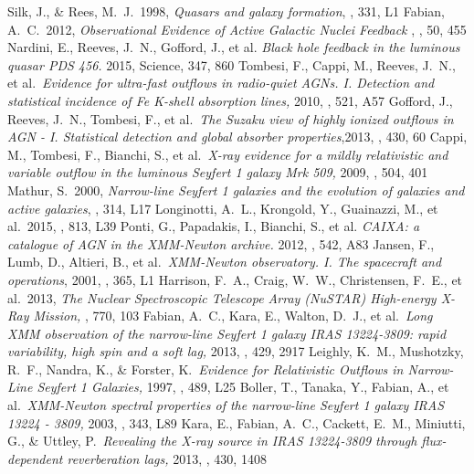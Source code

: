 \documentclass[10pt, a4paper]{article}
\begin{document}
\begin{thebibliography}{1}

 Silk, J., \& Rees, M.~J.\ 1998, \emph{Quasars and galaxy formation}, \aap, 331, L1 
 Fabian, A.~C.\ 2012, \emph{Observational Evidence of Active Galactic Nuclei Feedback} , \araa, 50, 455
 Nardini, E., Reeves, J.~N., Gofford, J., et al. \emph{Black hole feedback in the luminous quasar PDS 456.} 2015, Science, 347, 860 
 Tombesi, F., Cappi, M., Reeves, J.~N., et al.\ \emph{Evidence for ultra-fast outflows in radio-quiet AGNs. I. Detection and statistical incidence of Fe K-shell absorption lines, }2010, \aap, 521, A57 
 Gofford, J., Reeves, J.~N., Tombesi, F., et al.\ \emph{The Suzaku view of highly ionized outflows in AGN - I. Statistical detection and global absorber properties},2013, \mnras, 430, 60 
 Cappi, M., Tombesi, F., Bianchi, S., et al.\ \emph{X-ray evidence for a mildly relativistic and variable outflow in the luminous Seyfert 1 galaxy Mrk 509,} 2009, \aap, 504, 401 
 Mathur, S.\ 2000, \emph{Narrow-line Seyfert 1 galaxies and the evolution of galaxies and active galaxies}, \mnras, 314, L17 
 Longinotti, A.~L., Krongold, Y., Guainazzi, M., et al.\ 2015, \apjl, 813, L39 
 Ponti, G., Papadakis, I., Bianchi, S., et al. \emph{CAIXA: a catalogue of AGN in the XMM-Newton archive.}  2012, \aap, 542, A83 
 Jansen, F., Lumb, D., Altieri, B., et al.\ \emph{XMM-Newton observatory. I. The spacecraft and operations}, 2001, \aap, 365, L1 
 Harrison, F.~A., Craig, W.~W., Christensen, F.~E., et al.\ 2013, \emph{The Nuclear Spectroscopic Telescope Array (NuSTAR) High-energy X-Ray Mission,} \apj, 770, 103 
 Fabian, A.~C., Kara, E., Walton, D.~J., et al.\ \emph{Long XMM observation of the narrow-line Seyfert 1 galaxy IRAS 13224-3809: rapid variability, high spin and a soft lag,} 2013, \mnras, 429, 2917 
 Leighly, K.~M., Mushotzky, R.~F., Nandra, K., \& Forster, K.\ \emph{Evidence for Relativistic Outflows in Narrow-Line Seyfert 1 Galaxies,} 1997, \apjl, 489, L25 
 Boller, T., Tanaka, Y., Fabian, A., et al.\ \emph{XMM-Newton spectral properties of the narrow-line Seyfert 1 galaxy IRAS 13224 - 3809,} 2003, \mnras, 343, L89 
 Kara, E., Fabian, A.~C., Cackett, E.~M., Miniutti, G., \& Uttley, P.\ \emph{Revealing the X-ray source in IRAS 13224-3809 through flux-dependent reverberation lags,} 2013, \mnras, 430, 1408 

\end{thebibliography}
\end{document}
